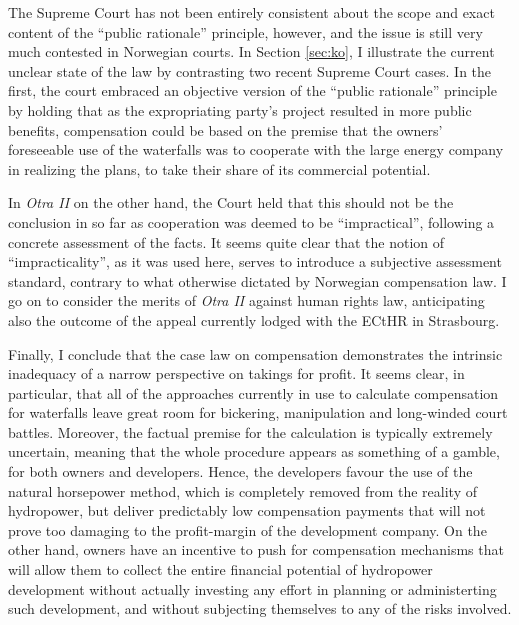 The Supreme Court has not been entirely consistent about the scope and exact content of the ``public rationale'' principle, however,   and the issue is still very much contested in Norwegian courts. In Section \ref{sec:ko}, I illustrate the current unclear state of the law by contrasting two recent Supreme Court cases. In the first, the court embraced an objective version of the ``public rationale'' principle by holding that as the expropriating party's project resulted in more public benefits, compensation could be based on the premise that the owners' foreseeable use of the waterfalls was to cooperate with the large energy company in realizing the plans, to take their share of its commercial potential. 

In {\it Otra II} on the other hand, the Court held that this should not be the conclusion in so far as cooperation was deemed to be ``impractical'', following a concrete assessment of the facts. It seems quite clear that the notion of ``impracticality'', as it was used here, serves to introduce a subjective assessment standard, contrary to what otherwise dictated by Norwegian compensation law. 
I go on to consider the merits of {\it Otra II} against human rights law, anticipating also the outcome of the appeal currently lodged with the ECtHR in Strasbourg.

Finally, I conclude that the case law on compensation demonstrates the intrinsic inadequacy of a narrow perspective on takings for profit. It seems clear, in particular, that all of the approaches currently in use to calculate compensation for waterfalls leave great room for bickering, manipulation and long-winded court battles. Moreover, the factual premise for the calculation is typically extremely uncertain, meaning that the whole procedure appears as something of a gamble, for both owners and developers. Hence, the developers favour the use of the natural horsepower method, which is completely removed from the reality of hydropower, but deliver predictably low compensation payments that will not prove too damaging to the profit-margin of the development company. On the other hand, owners have an incentive to push for compensation mechanisms that will allow them to collect the entire financial potential of hydropower development without actually investing any effort in planning or administerting such development, and without subjecting themselves to any of the risks involved. 

